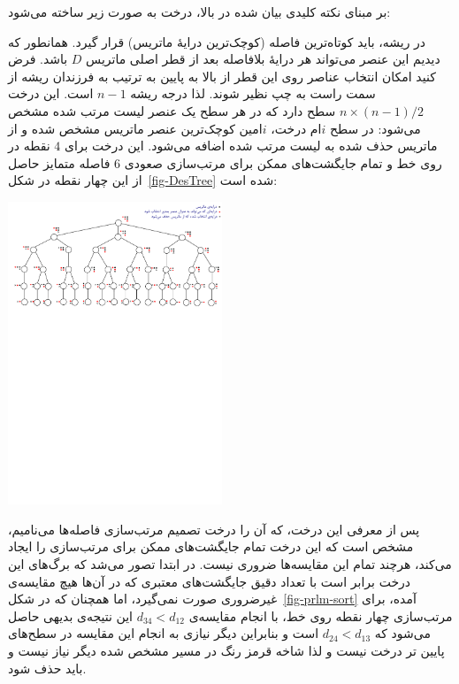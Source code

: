 \documentclass[a0,portrait]{a0poster}
\theoremstyle{definition}
\theoremstyle{plain}
\theoremstyle{definition}
\begin{document}
\begin{multicols}{2}
بر مبنای نکته کلیدی بیان شده در بالا، درخت به صورت زیر ساخته می‌شود:

 در ریشه، باید کوتاه‌ترین فاصله (کوچک‌ترین درایۀ ماتریس) قرار گیرد. 
 همانطور که دیدیم این 
عنصر می‌تواند هر درایۀ بلافاصله بعد از  قطر اصلی ماتریس $D$  باشد. فرض کنید
امکان انتخاب عناصر روی این قطر از بالا به پایین به ترتیب به فرزندان ریشه از
 سمت راست به چپ نظیر شوند. لذا درجه ریشه $n-1$ است.
این درخت $n\times(n-1)/2$ سطح دارد که در هر سطح یک عنصر 
لیست مرتب شده مشخص می‌شود: در سطح $i$ام درخت، $i$امین کوچک‌ترین عنصر ماتریس مشخص 
شده و از ماتریس حذف شده به لیست مرتب شده اضافه می‌شود.
این درخت برای $4$ نقطه در روی خط و تمام جایگشت‌های ممکن برای مرتب‌سازی 
صعودی $6$ فاصله متمایز حاصل از این چهار نقطه در
 شکل~\ref{fig-DesTree} شده است:
\begin{center}\vspace{1cm}
\includegraphics[width=0.48\textwidth]{DesTree.pdf}
\label{fig-DesTree}
\end{center}
پس از معرفی این درخت، که آن را درخت تصمیم مرتب‌سازی فاصله‌ها می‌نامیم، 
مشخص است که این درخت تمام جایگشت‌های ممکن برای مرتب‌سازی را ایجاد 
می‌کند، هرچند تمام این مقایسه‌ها ضروری نیست.
در ابتدا تصور می‌شد که برگ‌های این درخت برابر است با تعداد دقیق 
 جایگشت‌های معتبری که در آن‌ها هیچ مقایسه‌ی غیرضروری صورت نمی‌گیرد، 
 اما همچنان که در شکل~\ref{fig-prlm-sort} آمده، برای مرتب‌سازی چهار نقطه روی
 خط، با انجام مقایسه‌ی $d_{34}<d_{12}$ این نتیجه‌ی بدیهی 
 حاصل می‌شود که $d_{24}<d_{13}$  است و بنابراین دیگر نیازی 
 به انجام این مقایسه در سطح‌های پایین ‌تر درخت نیست و لذا 
 شاخه قرمز رنگ در مسیر 
 مشخص شده دیگر نیاز نیست و باید حذف شود. 


\end{multicols}
\end{document}
